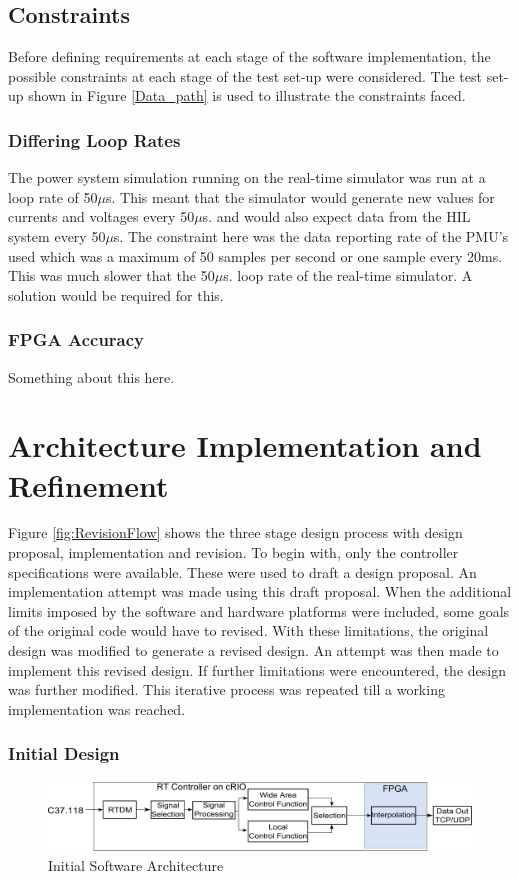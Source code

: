 \documentclass[conference]{IEEEtran}
\begin{document}
\subsection{Constraints}

Before defining requirements at each stage of the software implementation, the possible constraints at each stage of the test set-up were considered. The test set-up shown in Figure \ref{Data_path} is used to illustrate the constraints faced.

\subsubsection*{Differing Loop Rates}
The power system simulation running on the real-time simulator was run at a loop rate of 50$\mu$s. This meant that the simulator would generate new values for currents and voltages every 50$\mu$s. and would also expect data from the HIL system every 50$\mu$s. The constraint here was the data reporting rate of the PMU's used which was a maximum of 50 samples per second or one sample every 20ms. This was much slower that the 50$\mu$s. loop rate of the real-time simulator. A solution would be required for this.

\subsubsection*{FPGA Accuracy}
Something about this here.

\section{Architecture Implementation and Refinement}

Figure \ref{fig:RevisionFlow} shows the three stage design process with design proposal, implementation and revision. To begin with, only the controller specifications were available. These were used to draft a design proposal. An implementation attempt was made using this draft proposal. When the additional limits imposed by the software and hardware platforms were included, some goals of the original code would have to revised. With these limitations, the original design was modified to generate a revised design. An attempt was then made to implement this revised design. If further limitations were encountered, the design was further modified. This iterative process was repeated till a working implementation was reached.\\

\subsubsection{Initial Design}
\begin{figure}[htb]
\centering
\includegraphics[width=1\linewidth]{./InitialArch}
\caption{Initial Software Architecture}
\label{fig:InitialArch}
\end{figure}
\end{document}
